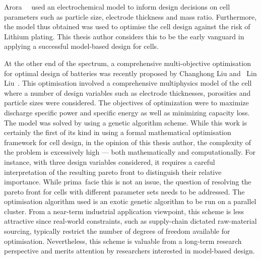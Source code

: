 Arora~\etal~\cite{Arora1999}  used an  electrochemical  model  to inform  design
decisions on cell parameters such as particle size, electrode thickness and mass
ratio. Furthermore, the model thus obtained was used to optimise the cell design
against the risk of Lithium plating. This thesis author considers this to be the
early vanguard in applying a successful model-based design for cells.

At the other  end of the spectrum, a  comprehensive multi-objective optimisation
for optimal design of batteries was  recently proposed by Changhong Liu and~ Lin
Liu~\cite{Liu2017b}.  This optimisation  involved  a comprehensive  multiphysics
model  of  the  cell where  a  number  of  design  variables such  as  electrode
thicknesses, porosities  and particle sizes  were considered. The  objectives of
optimization were  to maximize discharge  specific power and specific  energy as
well  as minimizing  capacity loss.  The  model was  solved by  using a  genetic
algorithm scheme. While this work is certainly  the first of its kind in using a
formal mathematical  optimisation framework for  cell design, in the  opinion of
this thesis author,  the complexity of the problem is  excessively high --- both
mathematically and  computationally. For  instance, with three  design variables
considered,  it  requires  a  careful interpretation  of  the  resulting  pareto
front  to  distinguish their  relative  importance.  While prima~facie  this  is
not  an  issue, the  question  of  resolving the  pareto  front  for cells  with
different parameter sets needs to  be addressed. The optimisation algorithm used
is  an  exotic genetic  algorithm  to  be run  on  a  parallel cluster.  From  a
near-term industrial application viewpoint, this scheme is less attractive since
real-world  constraints, such  as supply-chain  dictated raw-material  sourcing,
typically restrict the number of  degrees of freedom available for optimisation.
Nevertheless, this scheme is valuable  from a long-term research perspective and
merits attention by researchers interested in model-based design.




